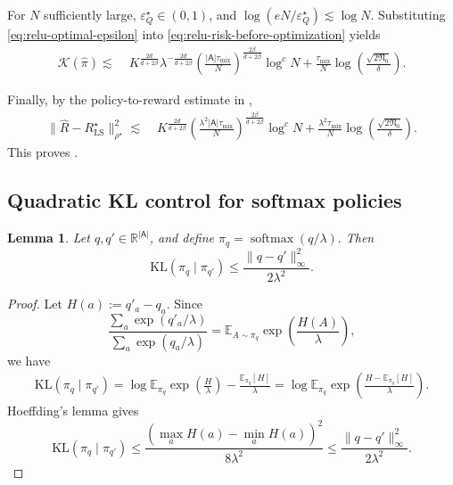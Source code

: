 \documentclass{article}
\newtheorem{lemma}[proposition]{Lemma}
\theoremstyle{definition}
\theoremstyle{remark}
\theoremstyle{plain}
\newcommand{\E}{\mathbb{E}}
\newcommand{\KL}{\mathrm{KL}}
\numberwithin{equation}{section}
\begin{document}
For \(N\) sufficiently large, \(\varepsilon_Q^\star\in(0,1)\), and
\(\log(eN/\varepsilon_Q^\star)\lesssim\log N\). Substituting
\eqref{eq:relu-optimal-epsilon} into
\eqref{eq:relu-risk-before-optimization} yields
\begin{equation}
\label{eq:relu-final-KL-rate}
\begin{aligned}
    \mathcal K(\widehat\pi)
    \lesssim\;&
    K^{\frac{2d}{d+2\beta}}
    \lambda^{-\frac{2d}{d+2\beta}}
    \left(
        \frac{
            |\mathsf A|\tau_{\mathrm{mix}}
        }{N}
    \right)^{\frac{2\beta}{d+2\beta}}
    \log^c N
    +
    \frac{\tau_{\mathrm{mix}}}{N}
    \log\left(
        \frac{\sqrt{2\mathfrak N_0}}{\delta}
    \right).
\end{aligned}
\end{equation}

Finally, by the policy-to-reward estimate in
,
\begin{equation}
\label{eq:relu-final-reward-rate}
\begin{aligned}
    \|\widehat R-R_{\mathrm{LS}}^\star\|_{\rho^\star}^2
    \lesssim\;&
    K^{\frac{2d}{d+2\beta}}
    \left(
        \frac{
            \lambda^2|\mathsf A|\tau_{\mathrm{mix}}
        }{N}
    \right)^{\frac{2\beta}{d+2\beta}}
    \log^c N
    +
    \frac{
        \lambda^2\tau_{\mathrm{mix}}
    }{N}
    \log\left(
        \frac{\sqrt{2\mathfrak N_0}}{\delta}
    \right).
\end{aligned}
\end{equation}
This proves .

\subsection{Quadratic KL control for softmax policies}
\begin{lemma}
\label{lem:softmax-KL}
Let \(q,q'\in\mathbb R^{|\mathsf A|}\), and define
\(
    \pi_q = \operatorname{softmax}(q/\lambda).
\)
Then
\[
    \KL(\pi_q\mid\pi_{q'})
    \leq
    \frac{\|q-q'\|_\infty^2}{2\lambda^2}.
\]
\end{lemma}
\begin{proof}
Let \(H(a):=q'_a-q_a\). Since
\[
    \frac{\sum_a\exp(q'_a/\lambda)}
         {\sum_a\exp(q_a/\lambda)}
    =
    \mathbb E_{A\sim\pi_q}
    \exp\left(\frac{H(A)}{\lambda}\right),
\]
we have
\begin{align}
\label{eq:KL_hoeffding}
    \KL(\pi_q\mid\pi_{q'})
    =
    \log
    \mathbb E_{\pi_q}
    \exp\left(\frac{H}{\lambda}\right)
    -
    \frac{\mathbb E_{\pi_q}[H]}{\lambda} = \log
    \mathbb E_{\pi_q}
    \exp\left(\frac{H-  \E_{\pi_q}[H]}{\lambda}\right)
    .
\end{align}
Hoeffding's lemma gives
\[
    \KL(\pi_q\mid\pi_{q'})
    \leq
    \frac{(\max_aH(a)-\min_aH(a))^2}{8\lambda^2}\le \frac{\|q-q'\|_\infty^2}{2\lambda^2}.
\]
\end{proof}
\end{document}

